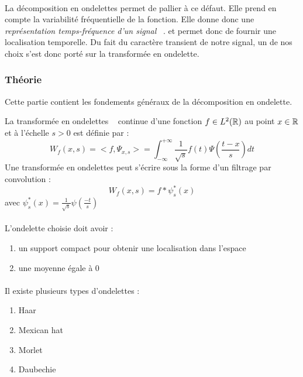 \paragraph{}
La décomposition en ondelettes permet de pallier à ce défaut.
Elle prend en compte la variabilité fréquentielle de la fonction. 
Elle donne donc une \emph{représentation temps-fréquence d'un signal} ~\cite{JBigot}.
et permet donc de fournir une localisation temporelle.
Du fait du caractère transient de notre signal, un de nos choix s'est donc porté sur la transformée en ondelette.

\subsubsection{Théorie}
Cette partie contient les fondements généraux de la décomposition en ondelette.

La transformée en ondelettes ~\cite{JBigot} continue d'une fonction $f  \in L^{2}(\mathbb{R})$ au point $x \in \mathbb{R} $
et à l'échelle $ s>0 $ est définie par  :
\begin{equation}
W_{f}(x,s) = <f,\Psi_{x,s}> = \int^{+\infty}_{- \infty} \frac{1}{\sqrt{s}}f(t)\Psi(\frac{t-x}{s})dt
\end{equation} 
Une transformée en ondelettes peut s'écrire sous la forme d'un filtrage par convolution :
\begin{equation}
W_{f}(x,s) = f * \psi^{*}_{s}(x)
\end{equation}
avec  $\psi^{*}_{s}(x) = \frac{1}{\sqrt{s}} \psi(\frac{-t}{s})$

\paragraph{}
L'ondelette choisie doit avoir :
\begin{enumerate}
\item un support compact pour obtenir une localisation dans l'espace
\item une moyenne égale à 0
\end{enumerate}
\paragraph{}
Il existe plusieurs types d'ondelettes :
\begin{enumerate}
\item Haar
\item Mexican hat
\item Morlet
\item Daubechie

\end{enumerate}


